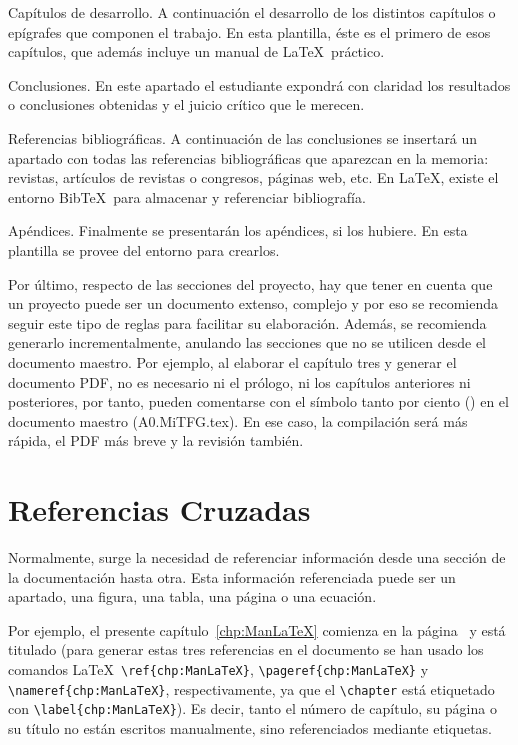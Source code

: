 \begin{descript}
	\item[Capítulos de desarrollo.] A continuación el desarrollo de los distintos capítulos o epígrafes que componen el trabajo. En esta plantilla, éste es el primero de esos capítulos, que además incluye un manual de \LaTeX\ práctico.

	\item[Conclusiones.] En este apartado el estudiante expondrá con claridad los resultados o conclusiones obtenidas y el juicio crítico que le merecen.

	\item[Referencias bibliográficas.] A continuación de las conclusiones se insertará un apartado con todas las referencias bibliográficas que aparezcan en la memoria: revistas, artículos de revistas o congresos, páginas web, etc. En \LaTeX, existe el entorno Bib\TeX\ para almacenar y referenciar bibliografía.

	\item[Apéndices.] Finalmente se presentarán los apéndices, si los hubiere. En esta plantilla se provee del entorno  para crearlos.
\end{descript}

Por último, respecto de las secciones del proyecto, hay que tener en cuenta que un proyecto puede ser un documento extenso, complejo y por eso se recomienda seguir este tipo de reglas para facilitar su elaboración. Además, se recomienda generarlo incrementalmente, anulando las secciones que no se utilicen desde el documento maestro. Por ejemplo, al elaborar el capítulo tres y generar el documento PDF, no es necesario ni el prólogo, ni los capítulos anteriores ni posteriores, por tanto, pueden comentarse con el símbolo tanto por ciento (\ttw{\%}) en el documento maestro (A0.MiTFG.tex). En ese caso, la compilación será más rápida, el PDF más breve y la revisión también.

\section{Referencias Cruzadas}
\label{sec:RefCruz}

Normalmente, surge la necesidad de referenciar información desde una sección de la documentación hasta otra. Esta información referenciada puede ser un apartado, una figura, una tabla, una página o una ecuación.

Por ejemplo, el presente capítulo~\ref{chp:ManLaTeX} comienza en la página~\pageref{chp:ManLaTeX} y está titulado  (para generar estas tres referencias en el documento se han usado los comandos \LaTeX\  \verb|\ref{chp:ManLaTeX}|, \verb|\pageref{chp:ManLaTeX}| y \verb|\nameref{chp:ManLaTeX}|, respectivamente, ya que el \verb|\chapter| está etiquetado con \verb|\label{chp:ManLaTeX}|). Es decir, tanto el número de capítulo, su página o su título no están escritos manualmente, sino referenciados mediante etiquetas.

